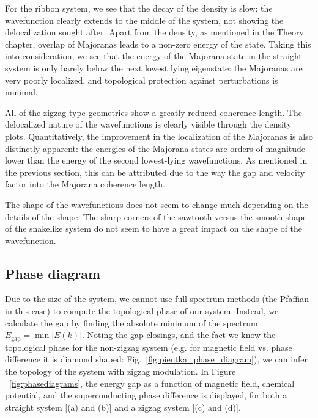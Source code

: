 			For the ribbon system, we see that the decay of the density is slow: the wavefunction clearly extends to the middle of the system, not showing the delocalization sought after.
			Apart from the density, as mentioned in the Theory chapter, overlap of Majoranas leads to a non-zero energy of the state.
			Taking this into consideration, we see that the energy of the Majorana state in the straight system is only barely below the next lowest lying eigenstate: the Majoranas are very poorly localized, and topological protection against perturbations is minimal.
			
			All of the zigzag type geometries show a greatly reduced coherence length.
			The delocalized nature of the wavefunctions is clearly visible through the density plots.
			Quantitatively, the improvement in the localization of the Majoranas is also distinctly apparent: the energies of the Majorana states are orders of magnitude lower than the energy of the second lowest-lying wavefunctions.
			As mentioned in the previous section, this can be attributed due to the way the gap and velocity factor into the Majorana coherence length.

			The shape of the wavefunctions does not seem to change much depending on the details of the shape.
			The sharp corners of the sawtooth versus the smooth shape of the snakelike system do not seem to have a great impact on the shape of the wavefunction.


		\subsection{Phase diagram}

			Due to the size of the system, we cannot use full spectrum methods (the Pfaffian in this case) to compute the topological phase of our system.
			Instead, we calculate the gap by finding the absolute minimum of the spectrum $E_\textrm{gap}=\min{|E(k)|}$.
			Noting the gap closings, and the fact we know the topological phase for the non-zigzag system (e.g. for magnetic field vs. phase difference it is diamond shaped: Fig.~\ref{fig:pientka_phase_diagram}), we can infer the topology of the system with zigzag modulation.
			In Figure ~\ref{fig:phasediagrams}, the energy gap as a function of magnetic field, chemical potential, and the superconducting phase difference is displayed, for both a straight system [(a) and (b)] and a zigzag system [(c) and (d)].

